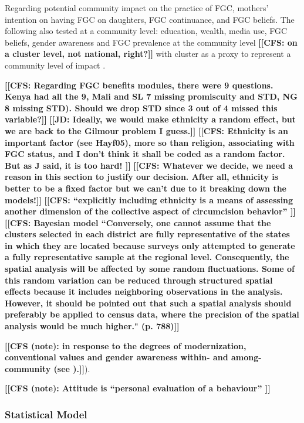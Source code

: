 \documentclass[12pt,]{article}
\newcommand{\comment}[1]{\textbf{[[#1]]}}
\newcommand{\cfcmt}[1]{\comment{CFS: #1}}
\newcommand{\cfonly}[1]{\comment{CFS (note): #1}}
\newcommand{\jdcmt}[1]{\comment{JD: #1}}
\begin{document}
Regarding potential community impact on the practice of FGC, mothers' intention on having FGC on daughters, FGC continuance, and FGC beliefs. The following also tested at a community level:  education, wealth, media use, FGC beliefs, gender awareness and FGC prevalence at the community level \cfcmt{on a cluster level, not national, right?} with cluster as a proxy to represent a community level of impact \cite{AligRen06, BoylSvec19, Hayf05, Krav02}.      
 
\cfcmt{Regarding FGC benefits modules, there were 9 questions.  Kenya had all the 9, Mali and SL 7 missing promiscuity and STD, NG 8 missing STD).  Should we drop STD since 3 out of 4 missed this variable?}
\jdcmt{Ideally, we would make ethnicity a random effect, but we are back to the Gilmour problem I guess.} \cfcmt{Ethnicity is an important factor (see Hayf05), more so than religion, associating with FGC status, and I don't think it shall be coded as a random factor.  But as J said, it is too hard! } \cfcmt{Whatever we decide, we need a reason in this section to justify our decision. After all, ethnicity is better to be a fixed factor but we can’t due to it breaking down the models!}
\cfcmt{“explicitly including ethnicity is a means of assessing another dimension of the collective aspect of circumcision behavior” \cite{Hayf05}}
\cfcmt{Bayesian model \cite{KandNwak09} “Conversely, one cannot assume that the clusters selected in each district are fully representative of the states in which they are located because surveys only attempted to generate a fully representative sample at the regional level. Consequently, the spatial analysis will be affected by some random fluctuations.  Some of this random variation can be reduced through structured spatial effects because it includes neighboring observations in the analysis. However, it should be pointed out that such a spatial analysis should preferably be applied to census data, where the precision of the spatial analysis would be much higher." (p. 788)}

\cfonly {in response to the degrees of modernization, conventional values and gender awareness within- and among-community (see \cite{Achi14, BoylMcMo02, Hayf05, KandNwak09, ModrLiu13, Moor13, OdukAfol17, Youn02}).}).  

\cfonly{Attitude is “personal evaluation of a behaviour” \cite{Ajze91}}

\subsubsection{Statistical Model}\label{statistical-model}
\end{document}
